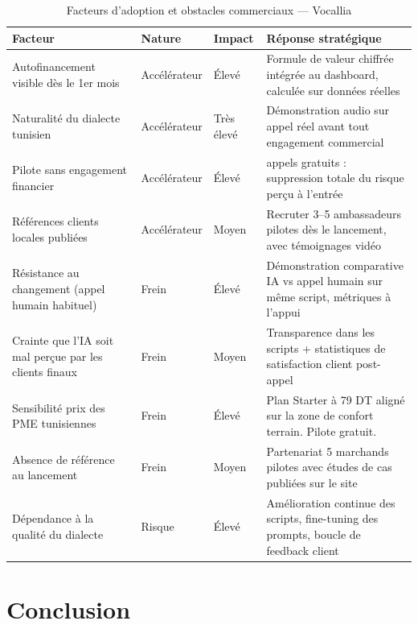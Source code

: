 \begin{table}[H]
\centering
\caption{Facteurs d'adoption et obstacles commerciaux --- Vocallia}
\vspace{4pt}
\begin{tabularx}{\textwidth}{|>{\raggedright\arraybackslash}p{3cm}|>{\raggedright\arraybackslash}p{1.8cm}|>{\raggedright\arraybackslash}p{1.5cm}|>{\raggedright\arraybackslash}X|}
\hline
\textbf{Facteur} & \textbf{Nature} & \textbf{Impact} & \textbf{Réponse stratégique} \\
\hline
Autofinancement visible dès le 1er mois & Accélérateur & Élevé & Formule de valeur chiffrée intégrée au dashboard, calculée sur données réelles \\
\hline
Naturalité du dialecte tunisien & Accélérateur & Très élevé & Démonstration audio sur appel réel avant tout engagement commercial \\
\hline
Pilote sans engagement financier & Accélérateur & Élevé & 50 appels gratuits : suppression totale du risque perçu à l'entrée \\
\hline
Références clients locales publiées & Accélérateur & Moyen & Recruter 3--5 ambassadeurs pilotes dès le lancement, avec témoignages vidéo \\
\hline
Résistance au changement (appel humain habituel) & Frein & Élevé & Démonstration comparative IA vs appel humain sur même script, métriques à l'appui \\
\hline
Crainte que l'IA soit mal perçue par les clients finaux & Frein & Moyen & Transparence dans les scripts + statistiques de satisfaction client post-appel \\
\hline
Sensibilité prix des PME tunisiennes & Frein & Élevé & Plan Starter à 79 DT aligné sur la zone de confort terrain. Pilote gratuit. \\
\hline
Absence de référence au lancement & Frein & Moyen & Partenariat 5 marchands pilotes avec études de cas publiées sur le site \\
\hline
Dépendance à la qualité du dialecte & Risque & Élevé & Amélioration continue des scripts, fine-tuning des prompts, boucle de feedback client \\
\hline
\end{tabularx}
\end{table}

\section{Conclusion}
\label{conclusion3}


